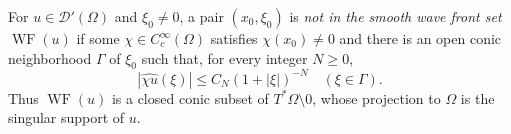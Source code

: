 
For $u\in\mathcal D'(\Omega)$ and $\xi_0\ne0$, a pair $(x_0,\xi_0)$ is \emph{not in the smooth wave front set} $\operatorname{WF}(u)$ if some $\chi\in C_c^\infty(\Omega)$ satisfies $\chi(x_0)\ne0$ and there is an open conic neighborhood $\Gamma$ of $\xi_0$ such that, for every integer $N\ge0$,
\[
|\widehat{\chi u}(\xi)|\le C_N(1+|\xi|)^{-N}\quad(\xi\in\Gamma).
\]
Thus $\operatorname{WF}(u)$ is a closed conic subset of $T^*\Omega\setminus0$, whose projection to $\Omega$ is the singular support of $u$.
